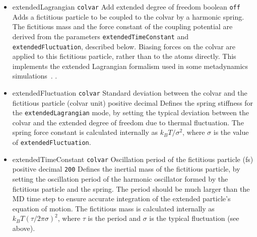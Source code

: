 \begin{itemize}
\item %
  \keydef
    {extendedLagrangian}{%
    \texttt{colvar}}{%
    Add extended degree of freedom}{%
    boolean}{%
    \texttt{off}}{%
    Adds a fictitious particle to be coupled to the colvar by a harmonic
    spring. The fictitious mass and the force constant of the coupling
    potential are derived from the parameters \texttt{extendedTimeConstant}
    and \texttt{extendedFluctuation}, described below. Biasing forces on the
    colvar are applied to this fictitious particle, rather than to the
    atoms directly.  This implements the extended Lagrangian formalism
    used in some metadynamics simulations~\cite{Iannuzzi2003}.
    .}

\item %
  \key
    {extendedFluctuation}{%
    \texttt{colvar}}{%
    Standard deviation between the colvar and the fictitious
    particle (colvar unit)}{%
    positive decimal}{%
    Defines the spring stiffness for the \texttt{extendedLagrangian}
    mode, by setting the typical deviation between the colvar and the extended
    degree of freedom due to thermal fluctuation.
    The spring force constant is calculated internally as $k_B T / \sigma^2$,
    where $\sigma$ is the value of \texttt{extendedFluctuation}.}

\item %
  \keydef
    {extendedTimeConstant}{%
    \texttt{colvar}}{%
    Oscillation period of the fictitious particle (fs)}{%
    positive decimal}{%
    \texttt{200}}{%
    Defines the inertial mass of the fictitious particle, by setting the
    oscillation period of the harmonic oscillator formed by the fictitious
    particle and the spring. The period
    should be much larger than the MD time step to ensure accurate integration
    of the extended particle's equation of motion.
    The fictitious mass is calculated internally as $k_B T (\tau/2 \pi \sigma)^2$,
    where $\tau$ is the period and $\sigma$ is the typical fluctuation (see above).}



\end{itemize}
